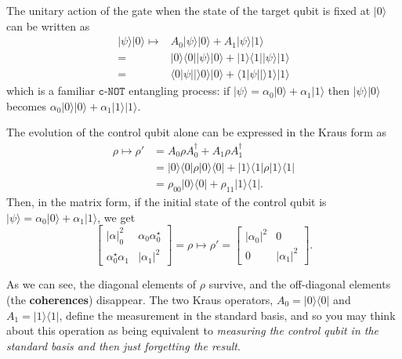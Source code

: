 \documentclass[fleqn]{article}
\begin{document}
The unitary action of the gate when the state of the target qubit is fixed at \(|0\rangle\) can be written as
\[
  \begin{aligned}
    |\psi\rangle|0\rangle
    \longmapsto
    & A_0|\psi\rangle|0\rangle + A_1|\psi\rangle|1\rangle
  \\=& |0\rangle\langle 0||\psi\rangle|0\rangle + |1\rangle\langle 1||\psi\rangle|1\rangle
  \\=& \langle 0|\psi||\rangle 0\rangle|0\rangle + \langle 1|\psi||\rangle 1\rangle|1\rangle
  \end{aligned}
\]
which is a familiar \(\texttt{c-NOT}\) entangling process: if \(|\psi\rangle=\alpha_0|0\rangle+\alpha_1|1\rangle\) then \(|\psi\rangle|0\rangle\) becomes \(\alpha_0|0\rangle|0\rangle+\alpha_1|1\rangle|1\rangle\).

The evolution of the control qubit alone can be expressed in the Kraus form as
\[
  \begin{aligned}
    \rho \longmapsto \rho'
    &= A_0\rho A_0^\dagger + A_1\rho A_1^\dagger
  \\&= |0\rangle\langle 0|\rho|0\rangle\langle 0| + |1\rangle\langle 1|\rho|1\rangle\langle 1|
  \\&= \rho_{00}|0\rangle\langle 0| + \rho_{11}|1\rangle\langle 1|.
  \end{aligned}
\]
Then, in the matrix form, if the initial state of the control qubit is \(|\psi\rangle=\alpha_0|0\rangle+\alpha_1|1\rangle\), we get
\[
  \begin{bmatrix}
    |\alpha|_0^2 & \alpha_0\alpha_0^\star
  \\\alpha_0^\star\alpha_1 & |\alpha_1|^2
  \end{bmatrix}
  = \rho
  \longmapsto
  \rho' =
  \begin{bmatrix}
    |\alpha_0|^2 & 0
  \\0 & |\alpha_1|^2
  \end{bmatrix}.
\]

As we can see, the diagonal elements of \(\rho\) survive, and the off-diagonal elements (the \textbf{coherences}) disappear.
The two Kraus operators, \(A_0=|0\rangle\langle 0|\) and \(A_1=|1\rangle\langle 1|\), define the measurement in the standard basis, and so you may think about this operation as being equivalent to \emph{measuring the control qubit in the standard basis and then just forgetting the result}.

\hypertarget{section-33}{%
\subsubsection{}\label{section-33}}
\end{document}
